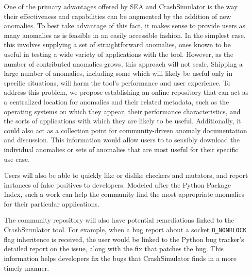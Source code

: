 One of the primary advantages offered by SEA and CrashSimulator is the way
their effectiveness and capabilities can be augmented by the addition of
new anomalies.  To best take advantage of this fact, it makes sense to
provide users as many anomalies as is feasible in an easily accessible
fashion.  In the simplest case, this involves supplying a set of
straightforward anomalies, ones known to be useful in testing a wide
variety of applications with the tool.
However, as the number of contributed anomalies grows, this approach
will not scale.  Shipping a large number of anomalies, including some
which will likely be useful only in specific situations, will harm the
tool's performance and user experience.  To address this problem, we
propose establishing an online repository
that can act as a centralized location for anomalies
and their related metadata,
such as the operating systems on which they appear,
their performance characteristics, and the sorts of applications
with which they are likely to be useful.  Additionally, it could also
act as a collection point for community-driven anomaly documentation
and discussion.  This information would allow users to
to sensibly download the individual anomalies or sets of anomalies that are most
useful for their specific use case.

Users will also be able to quickly like or dislike checkers and mutators,
and report instances of false positives to developers.
Modeled after the Python Package Index,
such a work can help the community find the most appropriate
anomalies for their particular applications.

The community repository will also have potential remediations linked to
the CrashSimulator tool.  For example, when a bug report about a
socket {\tt O\_NONBLOCK} flag inheritence is received, the user would be linked
to the Python
bug tracker's detailed report on the issue, along with the fix that
patches the bug.  This information helps developers fix the
bugs that CrashSimulator finds in a more timely manner.


%


%


